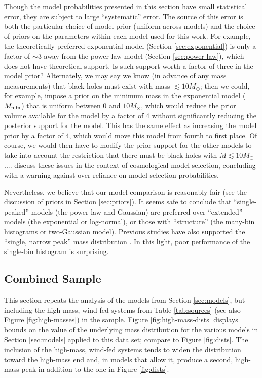 \documentclass[preprint]{aastex}
\newcommand{\Msun}{M_\odot}
\newcommand{\Mmin}{M_{\textnormal{min}}}
\begin{document}
Though the model probabilities presented in this section have small
statistical error, they are subject to large ``systematic'' error.
The source of this error is both the particular choice of model prior
(uniform across models) and the choice of priors on the parameters
within each model used for this work.  For example, the
theoretically-preferred exponential model (Section
\ref{sec:exponential}) is only a factor of $\sim 3$ away from the
power law model (Section \ref{sec:power-law}), which does not have
theoretical support.  Is such support worth a factor of three in the
model prior?  Alternately, we may say we know (in advance of any mass
measurements) that black holes must exist with mass $\lesssim
10\Msun$; then we could, for example, impose a prior on the minimum
mass in the exponential model ($\Mmin$) that is uniform between $0$
and $10 \Msun$, which would reduce the prior volume available for the
model by a factor of 4 without significantly reducing the posterior
support for the model.  This has the same effect as increasing the
model prior by a factor of 4, which would move this model from fourth
to first place.  Of course, we would then have to modify the prior
support for the other models to take into account the restriction that
there must be black holes with $M \lesssim 10\Msun$....
\citet{Linder2008} discuss these issues in the context of cosmological
model selection, concluding with a warning against over-reliance on
model selection probabilities.

Nevertheless, we believe that our model comparison is reasonably fair
(see the discussion of priors in Section \ref{sec:priors}).  It seems
safe to conclude that ``single-peaked'' models (the power-law and
Gaussian) are preferred over ``extended'' models (the exponential or
log-normal), or those with ``structure'' (the many-bin histograms or
two-Gaussian model).  Previous studies have also supported the
``single, narrow peak'' mass distribution \citep{Bailyn1998,Ozel2010}.
In this light, poor performance of the single-bin histogram is
surprising.

\subsection{Combined Sample}
\label{sec:high-mass}

This section repeats the analysis of the models from Section
\ref{sec:models}, but including the high-mass, wind-fed systems from
Table \ref{tab:sources} (see also Figure \ref{fig:high-masses}) in the
sample.  Figure \ref{fig:high-mass-dists} displays bounds on the value
of the underlying mass distribution for the various models in Section
\ref{sec:models} applied to this data set; compare to Figure
\ref{fig:dists}.  The inclusion of the high-mass, wind-fed systems
tends to widen the distribution toward the high-mass end and, in
models that allow it, produce a second, high-mass peak in addition
to the one in Figure \ref{fig:dists}.
\end{document}
